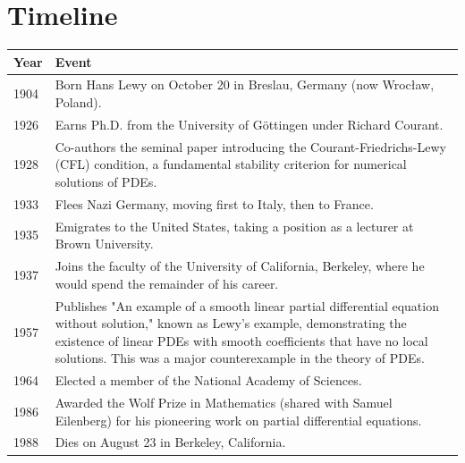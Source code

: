 \section*{Timeline}
\begin{tabularx}{\linewidth}{|p{1.5cm}|>{\raggedright\arraybackslash}X|}
\hline
\textbf{Year} & \textbf{Event} \\ \hline
1904 & Born Hans Lewy on October 20 in Breslau, Germany (now Wrocław, Poland). \\ \hline
1926 & Earns Ph.D. from the University of Göttingen under Richard Courant. \\ \hline
1928 & Co-authors the seminal paper introducing the Courant-Friedrichs-Lewy (CFL) condition, a fundamental stability criterion for numerical solutions of PDEs. \\ \hline
1933 & Flees Nazi Germany, moving first to Italy, then to France. \\ \hline
1935 & Emigrates to the United States, taking a position as a lecturer at Brown University. \\ \hline
1937 & Joins the faculty of the University of California, Berkeley, where he would spend the remainder of his career. \\ \hline
1957 & Publishes "An example of a smooth linear partial differential equation without solution," known as Lewy's example, demonstrating the existence of linear PDEs with smooth coefficients that have no local solutions. This was a major counterexample in the theory of PDEs. \\ \hline
1964 & Elected a member of the National Academy of Sciences. \\ \hline
1986 & Awarded the Wolf Prize in Mathematics (shared with Samuel Eilenberg) for his pioneering work on partial differential equations. \\ \hline
1988 & Dies on August 23 in Berkeley, California. \\ \hline
\end{tabularx}

